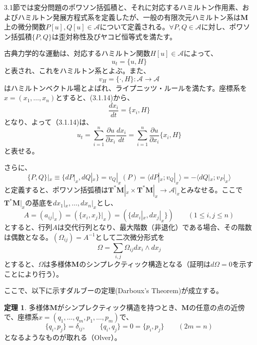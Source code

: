 \documentclass[a4paper, 11pt]{report}
\theoremstyle{definition}
\newtheorem{theorem}{定理}[section]
\begin{document}
 3.1節では変分問題のポワソン括弧積と、それに対応するハミルトン作用素、およびハミルトン発展方程式系を定義したが、一般の有限次元ハミルトン系は$\mathbf{M}$上の微分関数$P[u],Q[u]\in\mathcal{A}$について定義される。$\forall P,Q\in\mathcal{A}$に対し、ポワソン括弧積$\{ P, Q \}$は歪対称性及びヤコビ恒等式を満たす。

 古典力学的な運動は、対応するハミルトン関数$H[u]\in\mathcal{A}$によって、
\begin{equation}
u_t = \{ u, H \}  %
\end{equation}
と表され、これをハミルトン系とよぶ。また、
\begin{equation*}
v_H = \{ \cdot , H \}:\mathcal{A}\longrightarrow\mathcal{A}
\end{equation*}
はハミルトンベクトル場とよばれ、ライプニッツ・ルールを満たす。座標系を$x=(x_1,\dots,x_n)$とすると、(3.1.14)から、
\begin{equation*}
\frac{d x_i}{d t} = \{ x_i, H \}
\end{equation*}
となり、よって（3.1.14)は、
\begin{equation}
u_t = \sum_{i=1}^n \frac{\partial u}{\partial x_i}\frac{d x_i}{d t} = \sum_{i=1}^n \frac{\partial u}{\partial x_i}\{ x_i, H \}  %
\end{equation}
と表せる。

 さらに、
\begin{equation*}
\{P, Q\}|_x \equiv \{dP|_x, dQ|_x \} = v_Q|_x(P) = \langle dP|_x; v_Q|_x \rangle = -\langle dQ|_x; v_P|_x \rangle
\end{equation*}
と定義すると、ポワソン括弧積は$\mathbf{T}^*\mathbf{M}|_x\times\mathbf{T}^*\mathbf{M}|_x\longrightarrow\mathcal{A}|_x$とみなせる。ここで$\mathbf{T}^*\mathbf{M}|_x$の基底を$dx_1|_x,\dots,dx_n|_x$とし、
\begin{equation*}
A = (a_{ij}|_x) = (\{x_i, x_j\}|_x) = (\{dx_i|_x, dx_j|_x \}) \qquad (1\le i, j\le n)
\end{equation*} 
とすると、行列$A$は交代行列となり、最大階数（非退化）である場合、その階数は偶数となる。$(\Omega_{ij}) = A^{-1}$として二次微分形式を
\begin{equation}
\Omega = \sum_{i,j}\Omega_{ij}dx_i\wedge dx_j  %
\end{equation} 
とすると、$\Omega$は多様体$\mathbf{M}$のシンプレクティック構造となる（証明は$d\Omega=0$を示すことにより行う）。

 ここで、以下に示すダルブーの定理(Darboux's Theorem)が成立する。

\begin{theorem}
 多様体$\mathbf{M}$がシンプレクティック構造を持つとき、$\mathbf{M}$の任意の点の近傍で、座標系$x=(q_1,\dots,q_m,p_1,\dots,p_m)$で、
\begin{equation}
\{ q_i, p_j \} = \delta_{ij}, \qquad \{ q_i, q_j \} = 0 = \{ p_i, p_j \} \qquad (2m=n)  %
\end{equation}
となるようなものが取れる（Olver\cite[Chap.6]{Olver4}）。
\end{theorem}
\end{document}
